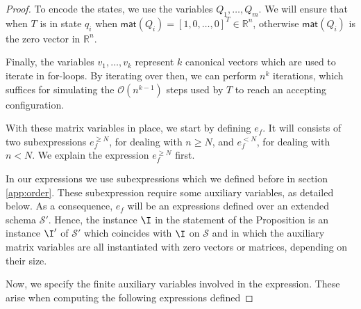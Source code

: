 \begin{proof}
 

To encode the states, we use the variables $Q_1,\ldots,Q_m$. We will ensure that when $T$ is in state 
$q_i$ when
 $\mathsf{mat}(Q_i)=[1,0,\ldots,0]^T\in\mathbb{R}^n$, otherwise $\mathsf{mat}(Q_i)$ is the zero 
 vector in $\mathbb{R}^n$.	

Finally, the variables $v_1,\ldots,v_{k}$ represent $k$ canonical vectors  which are used to iterate 
in for-loops. By iterating over then, we can perform $n^{k}$ iterations, 
which suffices for simulating the $\mathcal{O}(n^{k-1})$ steps used by $T$ to reach an accepting configuration. 

With these matrix variables in place, we start by defining $e_f$. It will consists of two subexpressions
$e_f^{\geq N}$, for dealing with $n\geq N$, and $e_f^{<N}$, for dealing with $n<N$. We explain the expression
$e_f^{\geq N}$ first.



In our  expressions we use subexpressions which we defined before in section \ref{app:order}. These subexpression 
require some auxiliary variables, as detailed below. As a consequence, $e_f$ will be an expressions 
defined over an extended schema $\mathcal{S}'$. Hence, the instance $\I$ in the statement of the Proposition 
is  an instance $\I'$ of $\mathcal{S}'$ which
coincides with $\I$ on $\mathcal{S}$ and in which the auxiliary matrix variables are all instantiated with 
zero vectors or matrices, depending on their size.

Now, we specify the finite auxiliary variables involved in the \langfor expression. These arise
when computing the following \langfor expressions defined 


\end{proof}
